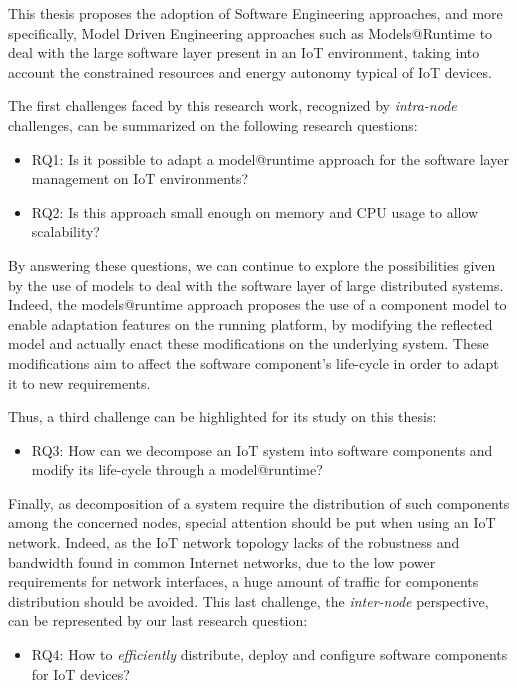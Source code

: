 This thesis proposes the adoption of Software Engineering approaches, and more specifically, Model Driven Engineering approaches such as Models@Runtime\cite{morin2010leveraging} to deal with the large software layer present in an IoT environment, taking into account the constrained resources and energy autonomy typical of IoT devices.

The first challenges faced by this research work, recognized by \textit{intra-node} challenges, can be summarized on the following research questions:

\begin{itemize}
	\item RQ1: Is it possible to adapt a model@runtime approach for the software layer management on IoT environments?
	\item RQ2: Is this approach small enough on memory and CPU usage to allow scalability?
\end{itemize}

By answering these questions, we can continue to explore the possibilities given by the use of models to deal with the software layer of large distributed systems.
Indeed, the models@runtime approach proposes the use of a component model to enable adaptation features on the running platform, by modifying the reflected model and actually enact these modifications on the underlying system.
These modifications aim to affect the software component's life-cycle in order to adapt it to new requirements.

Thus, a third challenge can be highlighted for its study on this thesis:

\begin{itemize}
	\item RQ3: How can we decompose an IoT system into software components and modify its life-cycle through a model@runtime?
\end{itemize}

Finally, as decomposition of a system require the distribution of such components among the concerned nodes, special attention should be put when using an IoT network.
Indeed, as the IoT network topology lacks of the robustness and bandwidth found in common Internet networks, due to the low power requirements for network interfaces, a huge amount of traffic for components distribution should be avoided.
This last challenge, the \textit{inter-node} perspective, can be represented by our last research question:

\begin{itemize}
	\item RQ4: How to \textit{efficiently} distribute, deploy and configure software components for IoT devices?
\end{itemize}

